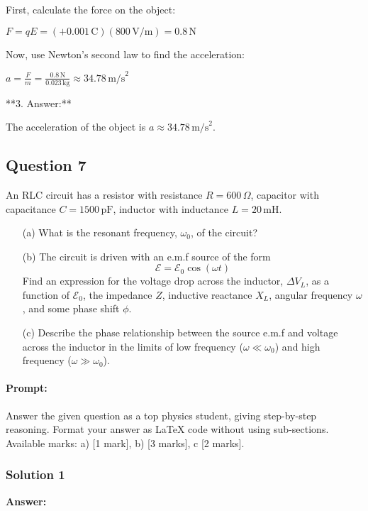 \documentclass{article}
\begin{document}
First, calculate the force on the object:

$F = qE = (+0.001 \, \text{C})(800 \, \text{V/m}) = 0.8 \, \text{N}$

Now, use Newton's second law to find the acceleration:

$a = \frac{F}{m} = \frac{0.8 \, \text{N}}{0.023 \, \text{kg}} \approx 34.78 \, \text{m/s}^2$

**3. Answer:**

The acceleration of the object is $a \approx 34.78 \, \text{m/s}^2$.


\subsection{Question 7}
An RLC circuit has a resistor with resistance $R = 600\,\Omega$, capacitor with capacitance $C = 1500\,\mathrm{pF}$, inductor with inductance $L = 20\,\mathrm{mH}$.  

\begin{enumerate}
    \item[(a)] What is the resonant frequency, $\omega_0$, of the circuit?  

    \item[(b)] The circuit is driven with an e.m.f source of the form  
    \[
    \mathcal{E} = \mathcal{E}_0 \cos(\omega t)
    \]  
    Find an expression for the voltage drop across the inductor, $\Delta V_L$, as a function of $\mathcal{E}_0$, the impedance $Z$, inductive reactance $X_L$, angular frequency $\omega$, and some phase shift $\phi$.  

    \item[(c)] Describe the phase relationship between the source e.m.f and voltage across the inductor in the limits of low frequency ($\omega \ll \omega_0$) and high frequency ($\omega \gg \omega_0$).
\end{enumerate}


\paragraph{Prompt: \\} 
Answer the given question as a top physics student, giving step-by-step reasoning. Format your answer as LaTeX code without using sub-sections. Available marks: a) [1 mark], b) [3 marks], c [2 marks].

\subsubsection{Solution 1}
\textbf{Answer:}
\end{document}
